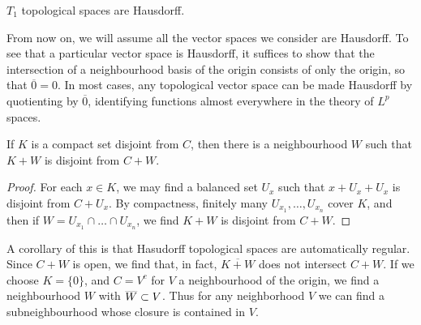 \begin{corollary}
    $T_1$ topological spaces are Hausdorff.
\end{corollary}

From now on, we will assume all the vector spaces we consider are Hausdorff. To see that a particular vector space is Hausdorff, it suffices to show that the intersection of a neighbourhood basis of the origin consists of only the origin, so that $\overline{0} = 0$. In most cases, any topological vector space can be made Hausdorff by quotienting by $\overline{0}$, identifying functions almost everywhere in the theory of $L^p$ spaces.

\begin{corollary}
    If $K$ is a compact set disjoint from $C$, then there is a neighbourhood $W$ such that $K + W$ is disjoint from $C + W$.
\end{corollary}
\begin{proof}
    For each $x \in K$, we may find a balanced set $U_x$ such that $x + U_x + U_x$ is disjoint from $C + U_x$. By compactness, finitely many $U_{x_1}, \dots, U_{x_n}$ cover $K$, and then if $W = U_{x_1} \cap \dots \cap U_{x_n}$, we find $K + W$ is disjoint from $C + W$.
\end{proof}

A corollary of this is that Hasudorff topological spaces are automatically regular. Since $C + W$ is open, we find that, in fact, $\overline{K + W}$ does not intersect $C + W$. If we choose $K = \{ 0 \}$, and $C = V^c$ for $V$ a neighbourhood of the origin, we find a neighbourhood $W$ with $\smash{\overline{W}} \subset V$. Thus for any neighborhood $V$ we can find a subneighbourhood whose closure is contained in $V$.

